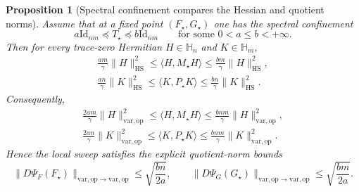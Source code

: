 \documentclass[11pt]{article}
\newcommand{\Id}{\mathrm{Id}}
\newcommand{\dotp}[2]{\langle #1,#2\rangle}
\newcommand{\Hh}{\mathbb{H}}
\newcommand{\op}{\mathrm{op}}
\newcommand{\varop}{\mathrm{var},\op}
\theoremstyle{plain}
\newtheorem{proposition}{Proposition}[section]
\begin{document}
\begin{proposition}[Spectral confinement compares the Hessian and quotient norms]
\label{prop:qot-hessian-vs-varop-bounds}
Assume that at a fixed point $(F_\star,G_\star)$ one has the spectral confinement
\[
a \Id_{nm} \preceq T_\star \preceq b \Id_{nm}
\qquad \text{for some } 0<a\le b<+\infty.
\]
Then for every trace-zero Hermitian $H \in \Hh_n$ and $K \in \Hh_m$,
\begin{align}
\frac{am}{\gamma}\|H\|_{\mathrm{HS}}^2
\le
\dotp{H}{M_\star H}
\le
\frac{bm}{\gamma}\|H\|_{\mathrm{HS}}^2,
\label{eq:Mstar-HS}\\
\frac{an}{\gamma}\|K\|_{\mathrm{HS}}^2
\le
\dotp{K}{P_\star K}
\le
\frac{bn}{\gamma}\|K\|_{\mathrm{HS}}^2.
\label{eq:Pstar-HS}
\end{align}
Consequently,
\begin{align}
\frac{2am}{\gamma}\|H\|_{\varop}^2
\le
\dotp{H}{M_\star H}
\le
\frac{bnm}{\gamma}\|H\|_{\varop}^2,
\label{eq:Mstar-varop}\\
\frac{2an}{\gamma}\|K\|_{\varop}^2
\le
\dotp{K}{P_\star K}
\le
\frac{bnm}{\gamma}\|K\|_{\varop}^2.
\label{eq:Pstar-varop}
\end{align}
Hence the local sweep satisfies the explicit quotient-norm bounds
\begin{equation}
\label{eq:qot-local-varop-lipschitz}
\|D\Psi_F(F_\star)\|_{\varop \to \varop}
\le
\sqrt{\frac{bn}{2a}},
\qquad
\|D\Psi_G(G_\star)\|_{\varop \to \varop}
\le
\sqrt{\frac{bm}{2a}}.
\end{equation}
\end{proposition}
\end{document}
